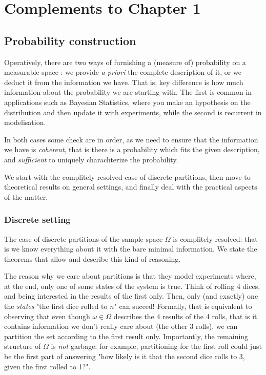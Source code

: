 
\chapter*{Complements to Chapter 1}
% 
\section{Probability construction}

Operatively, there are two ways of furnishing a (measure of) probability on a measurable space \measurablespace: we provide \textit{a priori} the complete description of it, or we deduct it from the information we have. That is, key difference is how much information about the probability we are starting with. The first is common in applications such as Bayesian Statistics, where you make an hypothesis on the distribution and then update it with experiments, while the second is recurrent in modelisation. 

In both cases some check are in order, as we need to ensure that the information we have is \textit{coherent}, that is there is a probability which fits the given description, and \textit{sufficient} to uniquely charachterize the probability.

We start with the complitely resolved case of discrete partitions, then move to theoretical results on general settings, and finally deal with the practical aspects of the matter. 

\subsection{Discrete setting}

The case of discrete partitions of the sample space $\Omega$ is complitely resolved: that is we know everything about it with the bare minimal information. We state the theorems that allow and describe this kind of reasoning.

\begin{my_remark}
	\label{usefullness_partitions}
	The reason why we care about partitions is that they model experiments where, at the end, only one of some states of the system is true. 
	Think of rolling 4 dices, and being interested in the results of the first only. Then, only (and exactly) one the \textit{states} "the first dice rolled to $n$" can suceed!
	Formally, that is equivalent to observing that even though $\omega \in \Omega$ describes the 4 results of the 4 rolls, that is it contains information we don't really care about (the other 3 rolls), we can partition the set according to the first result only. 
	Importantly, the remaining structure of $\Omega$ is \textit{not} garbage: for example, partitioning for the first roll could just be the first part of answering "how likely is it that the second dice rolls to 3, given the first rolled to 1?".
\end{my_remark}

